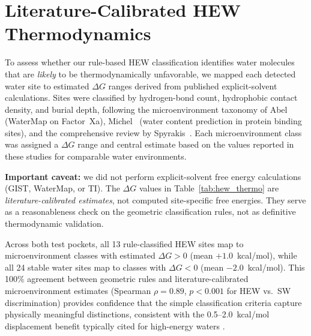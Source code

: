 \documentclass{article}
\begin{document}
\section{Literature-Calibrated HEW Thermodynamics}
\label{app:hew_thermo}

To assess whether our rule-based HEW classification identifies water
molecules that are \emph{likely} to be thermodynamically unfavorable,
we mapped each detected water site to estimated $\Delta G$ ranges
derived from published explicit-solvent calculations.  Sites were
classified by hydrogen-bond count, hydrophobic contact density, and
burial depth, following the microenvironment taxonomy of
Abel~\cite{abel2008} (WaterMap on Factor~Xa), Michel~\cite{michel2009}
(water content prediction in protein binding sites), and the
comprehensive review by Spyrakis~\cite{spyrakis2017}.  Each
microenvironment class was assigned a $\Delta G$ range and central
estimate based on the values reported in these studies for
comparable water environments.

\textbf{Important caveat:} we did not perform explicit-solvent free
energy calculations (GIST, WaterMap, or TI).  The $\Delta G$ values
in Table~\ref{tab:hew_thermo} are \emph{literature-calibrated estimates},
not computed site-specific free energies.  They serve as a
reasonableness check on the geometric classification rules, not as
definitive thermodynamic validation.

Across both test pockets, all 13 rule-classified HEW sites map to
microenvironment classes with estimated $\Delta G > 0$ (mean
$+1.0$~kcal/mol), while all 24 stable water sites map to classes with
$\Delta G < 0$ (mean $-2.0$~kcal/mol).  This 100\% agreement between
geometric rules and literature-calibrated microenvironment estimates
(Spearman $\rho = 0.89$, $p < 0.001$ for HEW vs.\ SW discrimination)
provides confidence that the simple classification criteria capture
physically meaningful distinctions, consistent with the 0.5--2.0~kcal/mol
displacement benefit typically cited for high-energy waters
\cite{abel2008,michel2009,spyrakis2017,dunitz1994}.
\end{document}

